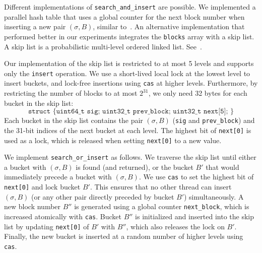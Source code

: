 Different implementations of \texttt{search\_and\_insert} are possible.
%
We implemented a parallel hash table that uses a global counter for the next block number when inserting a new pair $(\sigma, B)$, similar to~\cite{DBLP:conf/atva/WimmerHHSB06}.
%
%
An alternative implementation that performed better in our experiments integrates the \texttt{blocks} array with a skip list.
%
%
A skip list is a probabilistic multi-level ordered linked list.
See~\cite{DBLP:journals/cacm/Pugh90}.

Our implementation of the skip list is restricted to at most 5 levels and supports only the \texttt{insert} operation.
%
%
We use a short-lived local lock at the lowest level to insert buckets,
and lock-free insertions using \texttt{cas} at higher levels.
%
%
%
Furthermore, by restricting the number of blocks to at most $2^{31}$, we only need 32 bytes for each bucket in the skip list:
%
%
$$\texttt{struct \{ uint64\_t sig; uint32\_t prev\_block; uint32\_t next[5]; \}}$$
%
Each bucket in the skip list contains the pair $(\sigma,B)$ (\texttt{sig} and \texttt{prev\_block}) and the 31-bit indices of the next bucket at each level.
The highest bit of \texttt{next[0]} is used as a lock, which is released when setting \texttt{next[0]} to a new value.


We implement \texttt{search\_or\_insert} as follows.
%
%
We traverse the skip list until either a bucket with $(\sigma,B)$ is found (and returned), or the bucket $B'$ that would immediately precede a bucket with $(\sigma,B)$.
%
%
We use \texttt{cas} to set the highest bit of \texttt{next[0]} and lock bucket $B'$.
%
%
This ensures that no other thread can insert $(\sigma,B)$ (or any other pair directly preceded by bucket $B'$) simultaneously.
%
%
A new block number $B''$ is generated using a global counter \texttt{next\_block}, which
is increased atomically with \texttt{cas}.
%
%
Bucket $B''$ is initialized and inserted into the skip list by updating \texttt{next[0]} of $B'$ with $B''$, which also releases the lock on $B'$.
%
%
Finally, the new bucket is inserted at a random number of higher levels using \texttt{cas}.
